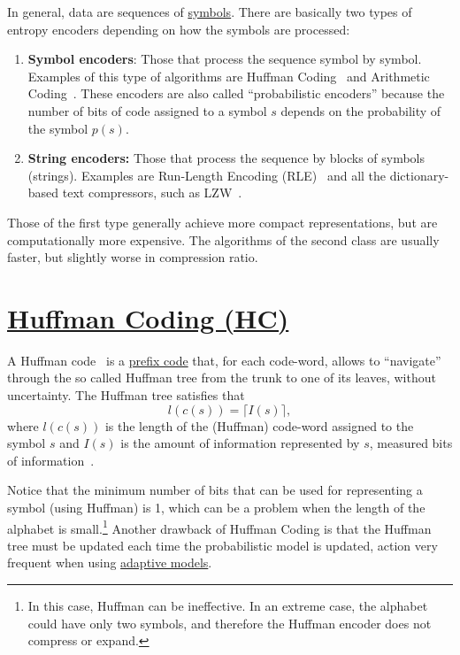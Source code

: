 In general, data are sequences of
\href{https://en.wikipedia.org/wiki/Symbol}{symbols}. There are
basically two types of entropy encoders depending on how the symbols
are processed:

\begin{enumerate}
\item \textbf{Symbol encoders}: Those that process the sequence symbol
  by symbol. Examples of this type of algorithms are Huffman
  Coding~\cite{vruiz__huffman_coding} and Arithmetic
  Coding~\cite{vruiz__arithmetic_coding}. These encoders are also
  called ``probabilistic encoders'' because the number of bits of code
  assigned to a symbol $s$ depends on the probability of the symbol
  $p(s)$.
\item \textbf{String encoders:} Those that process the sequence by
  blocks of symbols (strings). Examples are Run-Length Encoding
  (RLE)~\cite{vruiz__rle} and all the dictionary-based text
  compressors, such as LZW~\cite{vruiz__LZW}.
\end{enumerate}
  
Those of the first type generally achieve more compact
representations, but are computationally more expensive. The
algorithms of the second class are usually faster, but slightly worse
in compression ratio.

\section{\href{https://en.wikipedia.org/wiki/Huffman_coding}{Huffman Coding (HC)}}

A Huffman code~\cite{vruiz__huffman_coding,ruiz2000compresion} is a
\href{https://en.wikipedia.org/wiki/Prefix_code}{prefix code} that,
for each code-word, allows to ``navigate'' through the so called
Huffman tree from the trunk to one of its leaves, without
uncertainty. The Huffman tree satisfies that
\begin{equation}
  l(c(s)) = \lceil I(s)\rceil,
  \label{eq:huffman_performance}
\end{equation}
where $l(c(s))$ is the length of the (Huffman) code-word assigned to the
symbol $s$ and $I(s)$ is the amount of information represented by $s$,
measured bits of information~\cite{vruiz__information_theory}.

Notice that the minimum number of bits that can be used for
representing a symbol (using Huffman) is 1, which can be a problem
when the length of the alphabet is small.\footnote{In this case,
  Huffman can be ineffective. In an extreme case, the alphabet could
  have only two symbols, and therefore the Huffman encoder does not
  compress or expand.} Another drawback of Huffman Coding is that the
Huffman tree must be updated each time the probabilistic model is
updated, action very frequent when using
\href{https://en.wikipedia.org/wiki/Adaptive_Huffman_coding}{adaptive
  models}.

